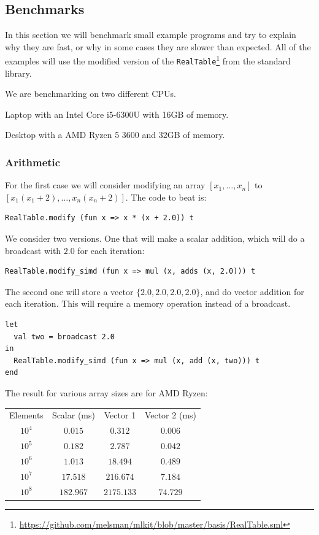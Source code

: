 \documentclass{article}
\begin{document}
\subsection{Benchmarks}

In this section we will benchmark small example programs and try to explain why they are fast, or why in some cases they are slower than expected. All of the examples will use the modified version of the \texttt{RealTable}\footnote{\url{https://github.com/melsman/mlkit/blob/master/basis/RealTable.sml}} from the standard library.

We are benchmarking on two different CPUs.

Laptop with an Intel Core i5-6300U with 16GB of memory.

Desktop with a AMD Ryzen 5 3600 and 32GB of memory.

\subsubsection{Arithmetic}

For the first case we will consider modifying an array $[x_1, \ldots, x_n]$ to $[x_1(x_1 + 2), \ldots, x_n(x_n + 2)]$. The code to beat is:
\begin{lstlisting}
RealTable.modify (fun x => x * (x + 2.0)) t
\end{lstlisting}

We consider two versions. One that will make a scalar addition, which will do a broadcast with $2.0$ for each iteration:
\begin{lstlisting}
RealTable.modify_simd (fun x => mul (x, adds (x, 2.0))) t
\end{lstlisting}
The second one will store a vector $\{ 2.0, 2.0, 2.0, 2.0 \}$, and do vector addition for each iteration. This will require a memory operation instead of a broadcast.
\begin{lstlisting}
let
  val two = broadcast 2.0
in
  RealTable.modify_simd (fun x => mul (x, add (x, two))) t
end
\end{lstlisting}
The result for various array sizes are for AMD Ryzen:
\begin{center}
\begin{tabular}{ c c c c }
    Elements & Scalar (ms) & Vector 1 & Vector 2 (ms) \\
    $10^4$ & $0.015$ & $0.312$ & $0.006$ \\
    $10^5$ & $0.182$ & $2.787$ & $0.042$ \\
    $10^6$ & $1.013$ & $18.494$ & $0.489$ \\
    $10^7$ & $17.518$ & $216.674$ & $7.184$ \\
    $10^8$ & $182.967$ & $2175.133$ & $74.729$ \\
\end{tabular}
\end{center}
\end{document}
